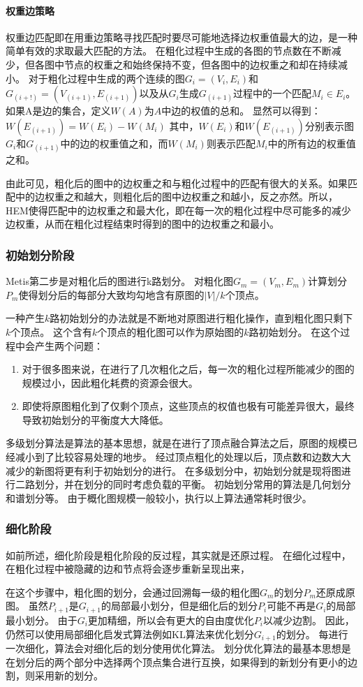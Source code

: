 \paragraph{权重边策略}
权重边匹配即在用重边策略寻找匹配时要尽可能地选择边权重值最大的边，是一种简单有效的求取最大匹配的方法。
在粗化过程中生成的各图的节点数在不断减少，但各图中节点的权重之和始终保持不变，但各图中的边权重之和却在持续减小。
对于粗化过程中生成的两个连续的图$G_i=(V_i,E_i)$和$G_(i+!)=(V_(i+1),E_(i+1))$以及从$G_i$生成$G_(i+1)$过程中的一个匹配$M_i \in E_i$。
如果A是边的集合，定义$W(A)$为$A$中边的权值的总和。
显然可以得到：$W(E_(i+1) )=W(E_i )-W(M_i )$
其中，$W(E_i)$和$W(E_(i+1))$分别表示图$G_i$和$G_(i+1)$中的边的权重值之和，而$W(M_i)$则表示匹配$M_i$中的所有边的权重值之和。

由此可见，粗化后的图中的边权重之和与粗化过程中的匹配有很大的关系。如果匹配中的边权重之和越大，则粗化后的图中边权重之和越小，反之亦然。所以，HEM使得匹配中的边权重之和最大化，即在每一次的粗化过程中尽可能多的减少边权重，从而在粗化过程结束时得到的图中的边权重之和最小。

\subsubsection{初始划分阶段}

Metis第二步是对粗化后的图进行k路划分。
对粗化图$G_m=(V_m,E_m)$计算划分$P_m$使得划分后的每部分大致均勾地含有原图的$|V|/k$个顶点。

一种产生$k$路初始划分的办法就是不断地对原图进行粗化操作，直到粗化图只剩下$k$个顶点。
这个含有$k$个顶点的粗化图可以作为原始图的$k$路初始划分。
在这个过程中会产生两个问题：
\begin{enumerate}
    \item 对于很多图来说，在进行了几次粗化之后，每一次的粗化过程所能减少的图的规模过小，因此粗化耗费的资源会很大。
    \item 即使将原图粗化到了仅剩个顶点，这些顶点的权值也极有可能差异很大，最终导致初始划分的平衡度大大降低。
\end{enumerate}

多级划分算法是算法的基本思想，就是在进行了顶点融合算法之后，原图的规模已经减小到了比较容易处理的地步。
经过顶点粗化的处理以后，顶点数和边数大大减少的新图将更有利于初始划分的进行。
在多级划分中，初始划分就是现将图进行二路划分，并在划分的同时考虑负载的平衡。
初始划分常用的算法是几何划分和谱划分等。
由于概化图规模一般较小，执行以上算法通常耗时很少。

\subsubsection{细化阶段}

如前所述，细化阶段是粗化阶段的反过程，其实就是还原过程。
在细化过程中，在粗化过程中被隐藏的边和节点将会逐步重新呈现出来，

在这个步骤中，粗化图的划分，会通过回溯每一级的粗化图$G_m$的划分$P_m$还原成原图。
虽然$P_{i+1}$是$G_{i+1}$的局部最小划分，但是细化后的划分$P_i$可能不再是$G_i$的局部最小划分。
由于$G_i$更加精细，所以会有更大的自由度优化$P_i$以减少边割。
因此，仍然可以使用局部细化启发式算法例如KL算法来优化划分$G_{i+1}$的划分。
每进行一次细化，算法会对细化后的划分使用优化算法。
划分优化算法的最基本思想是在划分后的两个部分中选择两个顶点集合进行互换，如果得到的新划分有更小的边割，则采用新的划分。
